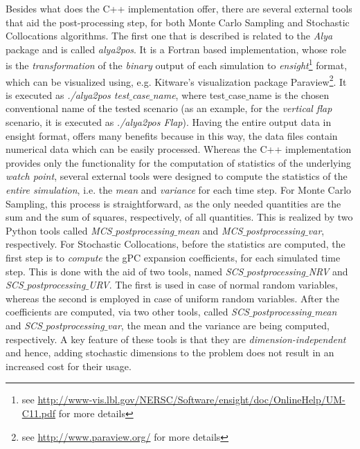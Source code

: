 	Besides what does the C++ implementation offer, there are several external tools that aid the post-processing step, for both Monte Carlo Sampling and Stochastic Collocations algorithms. The first one that is described is related to the \emph{Alya} package and is called \emph{alya2pos}. It is a Fortran based implementation, whose role is the \emph{transformation} of the \emph{binary} output of each simulation to \emph{ensight}\footnote{see \url{http://www-vis.lbl.gov/NERSC/Software/ensight/doc/OnlineHelp/UM-C11.pdf} for more details} format, which can be visualized using, e.g. Kitware's visualization package Paraview\footnote{see \url{http://www.paraview.org/} for more details}. It is executed as \emph{./alya2pos test$\_$case$\_$name}, where test$\_$case$\_$name is the chosen conventional name of the tested scenario (as an example, for the \emph{vertical flap} scenario, it is executed as \emph{./alya2pos Flap}). Having the entire output data in ensight format, offers many benefits because in this way, the data files contain numerical data which can be easily processed. Whereas the C++ implementation provides only the functionality for the computation of statistics of the underlying \emph{watch point}, several external tools were designed to compute the statistics of the \emph{entire simulation}, i.e. the \emph{mean} and \emph{variance} for each time step. For Monte Carlo Sampling, this process is straightforward, as the only needed quantities are the sum and the sum of squares, respectively, of all quantities. This is realized by two Python tools called \emph{MCS$\_$postprocessing$\_$mean} and \emph{MCS$\_$postprocessing$\_$var}, respectively. For Stochastic Collocations, before the statistics are computed, the first step is to \emph{compute} the gPC expansion coefficients, for each simulated time step. This is done with the aid of two tools, named \emph{SCS$\_$postprocessing$\_$NRV} and \emph{SCS$\_$postprocessing$\_$URV}. The first is used in case of normal random variables, whereas the second is employed in case of uniform random variables. After the coefficients are computed, via two other tools, called \emph{SCS$\_$postprocessing$\_$mean} and \emph{SCS$\_$postprocessing$\_$var}, the mean and the variance are being computed, respectively. A key feature of these tools is that they are \emph{dimension-independent} and hence, adding stochastic dimensions to the problem does not result in an increased cost for their usage.
